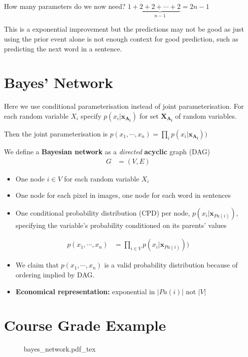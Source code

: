 \documentclass{article}
\begin{document}
How many parameters do we now need?
$ 1 + \underbrace{2 + 2 + \cdots + 2}_{n -1} = 2n - 1 $

This is a exponential improvement but the predictions may not be good as just using the prior event alone is not enough context for good prediction, such as predicting the next word in a sentence.

\section{Bayes' Network}

Here we use conditional parameterisation instead of joint parameterisation.
For each random variable $ X_{i} $ specify $ p(x_{i}|\boldsymbol{x}_{\boldsymbol{A_{i}}}) $ for set $ \boldsymbol{X_{A_{i}}} $ of random variables.

Then the joint parameterisation is
$ p(x_{1}, \cdots , x_{n}) = \prod_{i} p(x_{i} | \boldsymbol{x}_{\boldsymbol{A_{i}}}))  $

We define a \textbf{Bayesian network} as a \textit{directed} \textbf{acyclic} graph (DAG)
\begin{align}  
    G &= (V, E)
\end{align}

\begin{itemize}
    \item One node $ i \in V $ for each random variable $ X_{i} $
    \item One node for each pixel in images, one node for each word in sentences
    \item One conditional probability distribution (CPD) per node, $ p(x_{i} | \boldsymbol{x}_{Pa(i)}) $, specifying the variable's probability conditioned on its parents' values
\end{itemize}

\begin{align}
    p(x_{1}, \cdots , x_{n}) &= \prod_{i \in V} p(x_{i} | \boldsymbol{x}_{Pa(i)}))
\end{align}

\begin{itemize}
    \item We claim that $ p(x_{1}, \cdots , x_{n}) $ is a valid probability distribution because of ordering implied by DAG.
    \item \textbf{Economical representation:} exponential in $ |Pa(i)| $ not $ |V| $
\end{itemize}

\section{Course Grade Example}
\begin{figure}[hbt!]
    \centering
    \begin{normalsize}
        {bayes_network.pdf_tex}
    \end{normalsize}
    \label{fig:Bayes Network for course grading}
\end{figure}
\end{document}
